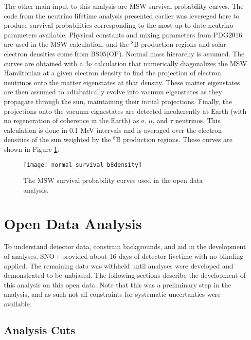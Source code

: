The other main input to this analysis are MSW survival probability curves.
The code from the neutrino lifetime analysis presented earlier was levereged here to produce survival probabilities corresponding to the most up-to-date neutrino parameters available.
Physical constants and mixing parameters from PDG2016 are used in the MSW
calculation, and the $^8$B production regions and solar electron densities come
from BS05(OP).
Normal mass hierarchy is assumed.
The curves are obtained with a 3$\nu$ calculation that numerically diagonalizes
the MSW Hamiltonian at a given electron density to find the projection of
electron neutrinos onto the matter eigenstates at that density.
These matter eigenstates are then assumed to adiabatically evolve into vacuum
eigenstates as they propagate through the sun, maintaining their initial
projections.
Finally, the projections onto the vacuum eignestates are detected incoherently
at Earth (with no regeneration of coherence in the Earth) as e, $\mu$, and
$\tau$ neutrinos.
This calculation is done in 0.1 MeV intervals and is averaged over the electron
densities of the sun weighted by the $^8$B production regions.
These curves are shown in Figure \ref{fig:solar:msw}.

\begin{figure}
\centering
\texttt{[image: normal\_survival\_b8density]}
\caption{The MSW survival probability curves used in the open data analysis.}
\label{fig:solar:msw}
\end{figure}

\section{Open Data Analysis}
\label{sec:solar:opendata}

To understand detector data, constrain backgrounds, and aid in the development of analyses, SNO+ provided about 16 days of detector livetime with no blinding applied.
The remaining data was withheld until analyses were developed and demonstrated to be unbiased. 
The following sections describe the development of this analysis on this open data.
Note that this was a preliminary step in the analysis, and as such not all constraints for systematic uncertanties were available.

\subsection{Analysis Cuts}
\label{sec:solar:open_cuts}

